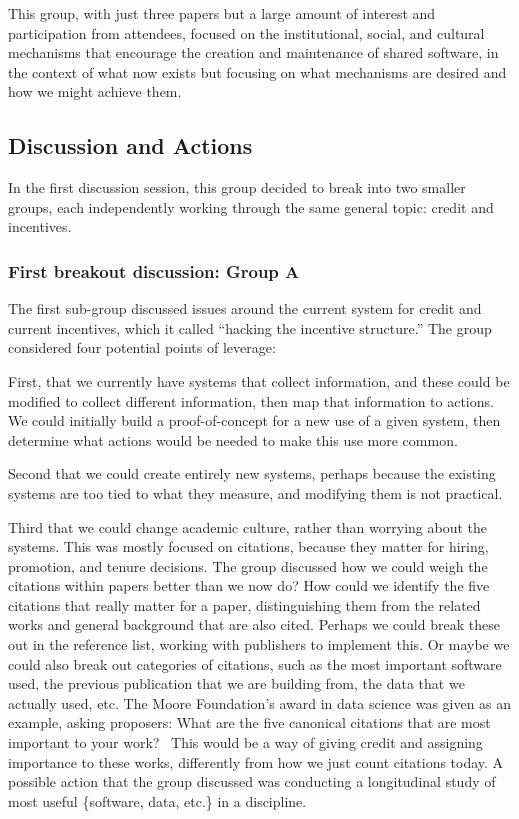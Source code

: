 \documentclass[11pt, oneside]{amsart}
\begin{document}
This group, with just three papers but a large amount of interest and
participation from attendees, focused on the institutional, social, and cultural
mechanisms that encourage the creation and maintenance of shared software, in the
context of what now exists but focusing on what mechanisms are desired and how
we might achieve them.


\subsection{Discussion and Actions}

In the first discussion session, this group decided to break into two smaller groups,
each independently working through the same general topic: credit and incentives.

\subsubsection{First breakout discussion: Group A}
The first sub-group discussed issues around the current system for credit and current
incentives, which it called ``hacking the incentive structure.'' The group
considered four potential points of leverage:

First, that we currently have systems that collect information, and these could
be modified to collect different information, then map that information to
actions. We could initially build a proof-of-concept for a new use of a given
system, then determine what actions would be needed to make this use more
common.

Second that we could create entirely new systems, perhaps because the existing
systems are too tied to what they measure, and modifying them is not practical.

Third that we could change academic culture, rather than worrying about the
systems. This was mostly focused on citations, because they matter for hiring,
promotion, and tenure decisions. The group discussed how we could weigh the
citations within papers better than we now do? How could we identify the five
citations that really matter for a paper, distinguishing them from the related
works and general background that are also cited. Perhaps we could break these
out in the reference list, working with publishers to implement this. Or maybe
we could also break out categories of citations, such as the most important
software used, the previous publication that we are building from, the data that
we actually used, etc. The Moore Foundation's award in data science was given as
an example, asking proposers: What are the five canonical citations that are
most important to your work?~\cite{moore-canonical} This would be a way of giving credit and assigning
importance to these works, differently from how we just count citations today. A
possible action that the group discussed was conducting a longitudinal study of
most useful \{software, data, etc.\} in a discipline.
\end{document}
